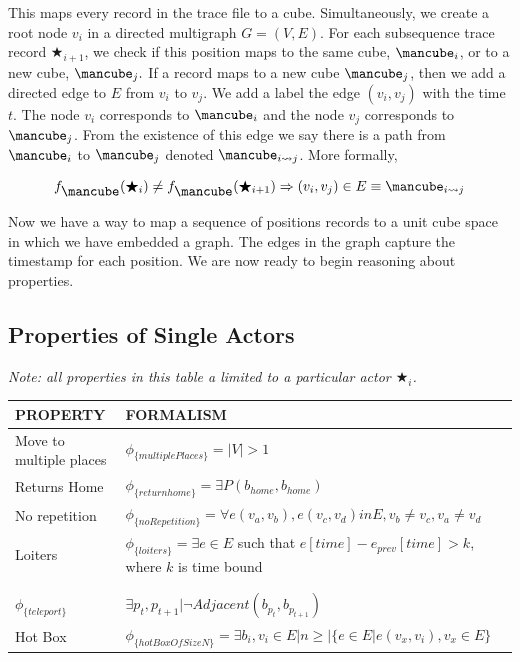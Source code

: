This maps every record in the trace file to a cube.
Simultaneously, we create a root node $v_i$ in a directed multigraph $G = (V,E)$.
For each subsequence trace record $\bigstar_{i+1}$, we check if this position maps to the same cube, $\cube_i$, or to a new cube, $\cube_{j}.$
If a record maps to a new cube $\cube_{j}$, then we add a directed edge to $E$ from $v_i$ to $v_{j}$.  
We add a label the edge $(v_i, v_j)$ with the time $t$.
The node $v_i$ corresponds to $\cube_i$ and the node $v_{j}$ corresponds to $\cube_{j}$.
From the existence of this edge we say there is a path from $\cube_i$ to $\cube_j$ denoted $\cube_{i\rightsquigarrow j}$.  More formally,

$$ f_{\cube}(\bigstar_i) \neq f_{\cube}(\bigstar_{i+1}) \Rightarrow (v_i, v_j) \in E \equiv \cube_{i\rightsquigarrow j} $$


Now we have a way to map a sequence of positions records to a unit cube space in which we have embedded a graph.
The edges in the graph capture the timestamp for each position.
We are now ready to begin reasoning about properties.


\subsection{Properties of Single Actors}

\emph{Note: all properties in this table a limited to a particular actor $\bigstar_i$.}
\begin{tabular}{| p{2.8cm} | p{11.5cm} | }
\hline
PROPERTY & FORMALISM \\ \hline
Move to multiple places & $\phi_{\{multiplePlaces\}} = |V| > 1$ \\ \hline
Returns Home & $\phi_{\{returnhome\}} = \exists P(b_{home}, b_{home})$ \\ \hline
No repetition & $\phi_{\{noRepetition\}} = \forall e(v_a, v_b), e(v_c,v_d) in E, v_b \neq v_c, v_a \neq v_d$ \\ \hline
 Loiters & $\phi_{\{loiters\}} =  \exists e \in E$ such that $e[time] - e_{prev}[time] > k$, where $k$ is time bound \\ \hline
 & \\ \hline
 & \\ \hline
$\phi_{\{teleport\}}$ & $  \exists  p_t, p_{t+1} | \lnot Adjacent(b_{p_t}, b_{p_{t+1}})$ \\ \hline
Hot Box & $\phi_{\{hotBoxOfSizeN\}} = \exists b_i, v_i \in E | n \geq |\{e \in E | e(v_x, v_i), v_x \in E\}$ \\ \hline
\end{tabular}


